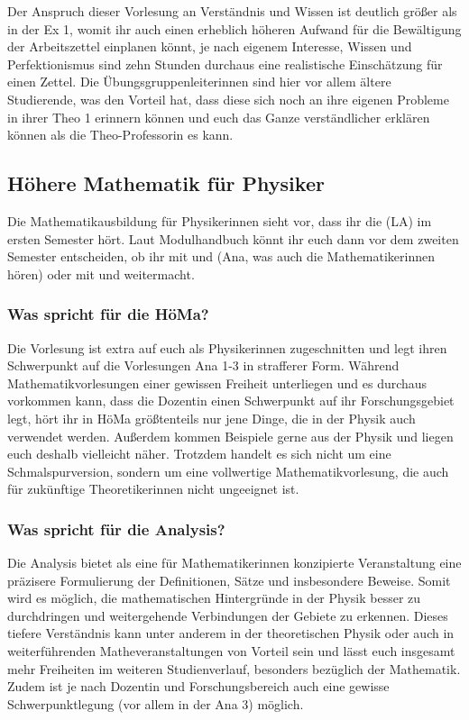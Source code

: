Der Anspruch dieser Vorlesung an Verständnis und Wissen ist deutlich größer als in der \gls{Ex} 1, womit ihr auch einen erheblich höheren Aufwand für die Bewältigung der Arbeitszettel einplanen könnt, je nach eigenem Interesse, Wissen und Perfektionismus sind zehn Stunden durchaus eine realistische Einschätzung für einen Zettel. Die Übungsgruppenleiterinnen sind hier vor allem ältere Studierende, was den Vorteil hat, dass diese sich noch an ihre eigenen Probleme in ihrer \gls{Theo} 1 erinnern können und euch das Ganze verständlicher erklären können als die Theo-Professorin es kann.

\vspace{-2mm}
\subsection{Höhere Mathematik für Physiker}
\label{mathephysik}

Die Mathematikausbildung für Physikerinnen sieht vor, dass ihr die  (\gls{LA}) im ersten Semester hört. Laut Modulhandbuch könnt ihr euch dann vor dem zweiten Semester entscheiden, ob ihr mit  und  (\gls{Ana}, was auch die Mathematikerinnen hören) oder mit  und  weitermacht.

\subsubsection{Was spricht für die HöMa?}
Die Vorlesung ist extra auf euch als Physikerinnen zugeschnitten und legt ihren Schwerpunkt auf die Vorlesungen \gls{Ana} 1-3 in strafferer Form. Während Mathematikvorlesungen einer gewissen Freiheit unterliegen und es durchaus vorkommen kann, dass die Dozentin einen Schwerpunkt auf ihr Forschungsgebiet legt, hört ihr in HöMa größtenteils nur jene Dinge, die in der Physik auch verwendet werden. Außerdem kommen Beispiele gerne aus der Physik und liegen euch deshalb vielleicht näher. Trotzdem handelt es sich nicht um eine Schmalspurversion, sondern um eine vollwertige Mathematikvorlesung, die auch für zukünftige Theoretikerinnen nicht ungeeignet ist.

\subsubsection{Was spricht für die Analysis?}
Die Analysis bietet als eine für Mathematikerinnen konzipierte Veranstaltung eine präzisere Formulierung der Definitionen, Sätze und insbesondere Beweise. Somit wird es möglich, die mathematischen Hintergründe in der Physik besser zu durchdringen und weitergehende Verbindungen der Gebiete zu erkennen. Dieses tiefere Verständnis kann unter anderem in der theoretischen Physik oder auch in weiterführenden Matheveranstaltungen von Vorteil sein und lässt euch insgesamt mehr Freiheiten im weiteren Studienverlauf, besonders bezüglich der Mathematik. Zudem ist je nach Dozentin und Forschungsbereich auch eine gewisse Schwerpunktlegung (vor allem in der \gls{Ana} 3) möglich.\\

